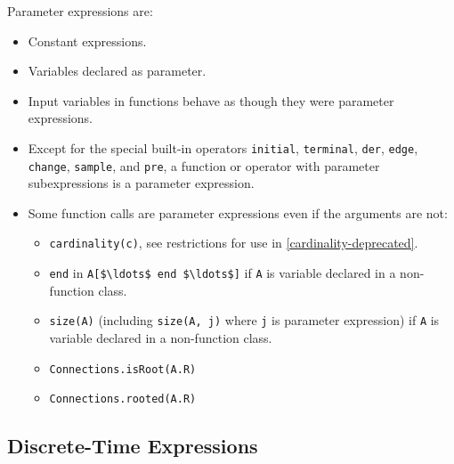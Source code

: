 Parameter expressions are:
\begin{itemize}
\item
  Constant expressions.
\item
  Variables declared as parameter.
\item
  Input variables in functions behave as though they were parameter expressions.
\item
  Except for the special built-in operators \lstinline!initial!, \lstinline!terminal!, \lstinline!der!,
  \lstinline!edge!, \lstinline!change!, \lstinline!sample!, and \lstinline!pre!, a function or operator with parameter
  subexpressions is a parameter expression.
\item
  Some function calls are parameter expressions even if the arguments are not:
  \begin{itemize}
  \item
    \lstinline!cardinality(c)!, see restrictions for use in \cref{cardinality-deprecated}.
  \item
    \lstinline!end! in \lstinline!A[$\ldots$ end $\ldots$]! if \lstinline!A! is variable declared in a non-function class.
  \item
    \lstinline!size(A)! (including \lstinline!size(A, j)! where \lstinline!j! is parameter expression) if \lstinline!A! is variable declared in a non-function class.
  \item
    \lstinline!Connections.isRoot(A.R)!
  \item
    \lstinline!Connections.rooted(A.R)!
  \end{itemize}
\end{itemize}

\subsection{Discrete-Time Expressions}\label{discrete-time-expressions}


